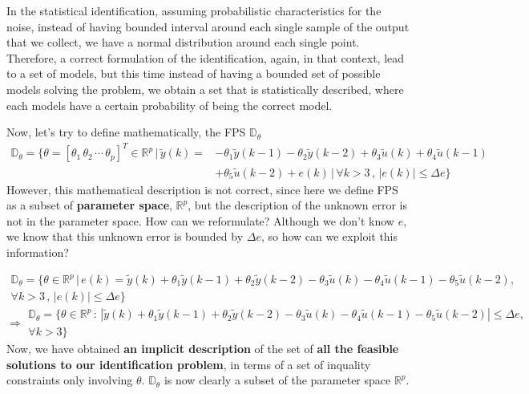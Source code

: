 \begin{factbox}
In the statistical identification, assuming probabilistic characteristics for the noise, instead of having bounded interval around each single sample of the output that we collect, we have a normal distribution around each single point. Therefore, a correct formulation of the identification, again, in that context, lead to a set of models, but this time instead of having a bounded set of possible models solving the problem, we obtain a set that is statistically described, where each models have a certain probability of being the correct model.
\end{factbox}

Now, let's try to define mathematically, the FPS \(\mathbb{D}_\theta\)
\[
\begin{aligned}
\mathbb{D}_\theta = \{
\theta = \left[\theta_1 \, \theta_2 \, \cdots \, \theta_p \right]^T \in \mathbb{R}^p \, | \, 
\tilde{y}(k) = & -\theta_1 \tilde{y}(k - 1) - \theta_2 \tilde{y}(k - 2) + \theta_3 \tilde{u}(k) + \theta_4 \tilde{u}(k - 1) \\
& + \theta_5 \tilde{u}(k - 2) + e(k) \, | \, \forall k > 3 \,,\, |e(k)|\leq \Delta e
\}
\end{aligned}
\]
However, this mathematical description is not correct, since here we define FPS as a subset of \textbf{parameter space}, \(\mathbb{R}^p\), but the description of the unknown error is not in the parameter space. How can we reformulate? Although we don't know \(e\), we know that this unknown error is bounded by \(\Delta e\), so how can we exploit this information?

\[
\begin{array}{l}
\mathbb{D}_\theta = \{
\theta \in \mathbb{R}^p \, | \, 
e(k) = \tilde{y}(k) + \theta_1 \tilde{y}(k - 1) + \theta_2 \tilde{y}(k - 2) 
- \theta_3 \tilde{u}(k) - \theta_4 \tilde{u}(k - 1) - \theta_5 \tilde{u}(k - 2), \\
\forall k > 3 \,,\, |e(k)| \leq \Delta e
\}
\end{array}
\]
\[
\Rightarrow
\begin{array}{l}
\mathbb{D}_\theta = \{
\theta \in \mathbb{R}^p \, : \, 
|\tilde{y}(k) + \theta_1 \tilde{y}(k - 1) + \theta_2 \tilde{y}(k - 2) 
- \theta_3 \tilde{u}(k) - \theta_4 \tilde{u}(k - 1) - \theta_5 \tilde{u}(k - 2)|\leq \Delta e, \\ \forall k > 3
\}
\end{array}
\]
Now, we have obtained \textbf{an implicit description} of the set of \textbf{all the feasible solutions to our identification problem}, in terms of a set of inquality constraints only involving \(\theta\). \(\mathbb{D}_\theta\) is now clearly a subset of the parameter space \(\mathbb{R}^p\).

